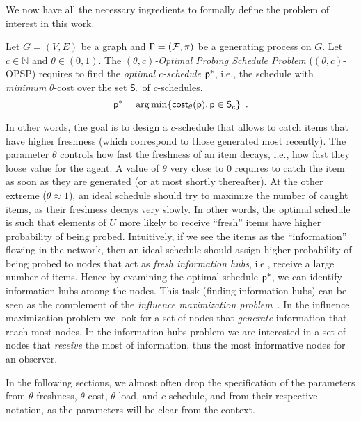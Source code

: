 We now have all the necessary ingredients to formally define the problem of
interest in this work.

 Let $G=(V,E)$ be a graph and $\Gamma=(\mathcal{F},\pi)$ be a
generating process on $G$. Let $c\in\mathbb{N}$ and
$\theta\in(0,1)$. The \emph{$(\theta,c)$-Optimal Probing Schedule Problem}
($(\theta,c)$-OPSP) requires to find the \emph{optimal $c$-schedule} $\mathsf{p}^*$,
i.e., the schedule with \emph{minimum} $\theta$-cost over the set $\mathsf{S}_c$
of $c$-schedules.
\[
	\mathsf{p}^*=\operatorname*{arg\,min}\{\mathsf{cost}_\theta(\mathsf{p}), \mathsf{p}\in\mathsf{S}_c\}\enspace.
\]

In other words, the goal is to design a $c$-schedule that allows to catch items
that have higher freshness (which correspond to those generated most recently).
The parameter $\theta$ controls how fast the freshness of an item decays, i.e.,
how fast they loose value for the agent. A value of $\theta$ very close to $0$
requires to catch the item  as soon as they are generated (or at most shortly
thereafter). At the other extreme ($\theta\approx 1$), an ideal schedule should
try to maximize the number of caught items, as their freshness decays very
slowly. In other words, the optimal schedule is such that elements of $U$ more
likely to receive ``fresh'' items have higher probability of being probed.
Intuitively, if we see the items as the ``information'' flowing in the network,
then an ideal schedule should assign higher probability of being probed to nodes
that act as \emph{fresh information hubs}, i.e., receive a large number of
items. Hence by examining the optimal schedule $\mathsf{p}^*$, we can identify
information hubs among the nodes. This task (finding information hubs) can be
seen as the complement of the \emph{influence maximization
problem}~\citep{Kempe2003,Kempe2005}. In the influence maximization problem we
look for a set of nodes that \emph{generate} information that reach most nodes.
In the information hubs problem we are interested in a set of nodes that
\emph{receive} the most of information, thus the most informative nodes for an
observer.

In the following sections, we almost often drop the specification of the
parameters from $\theta$-freshness, $\theta$-cost, $\theta$-load, and
$c$-schedule, and from their respective notation, as the parameters will be
clear from the context.

